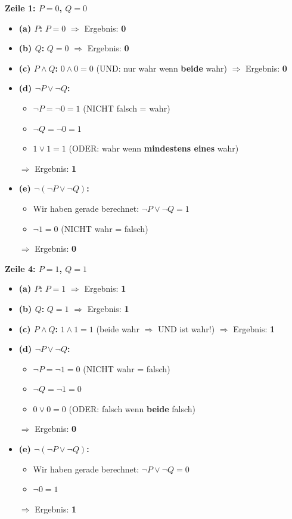\documentclass[a4paper,12pt]{article}
\begin{document}
\textbf{Zeile 1: $P=0$, $Q=0$}

\begin{itemize}
\item \textbf{(a) $P$:} $P = 0$ $\Rightarrow$ Ergebnis: \textbf{0}
\item \textbf{(b) $Q$:} $Q = 0$ $\Rightarrow$ Ergebnis: \textbf{0}
\item \textbf{(c) $P \wedge Q$:} $0 \wedge 0 = 0$ (UND: nur wahr wenn \textbf{beide} wahr) $\Rightarrow$ Ergebnis: \textbf{0}
\item \textbf{(d) $\neg P \vee \neg Q$:}
  \begin{itemize}
  \item $\neg P = \neg 0 = 1$ \quad (NICHT falsch = wahr)
  \item $\neg Q = \neg 0 = 1$
  \item $1 \vee 1 = 1$ \quad (ODER: wahr wenn \textbf{mindestens eines} wahr)
  \end{itemize}
  $\Rightarrow$ Ergebnis: \textbf{1}
\item \textbf{(e) $\neg(\neg P \vee \neg Q)$:}
  \begin{itemize}
  \item Wir haben gerade berechnet: $\neg P \vee \neg Q = 1$
  \item $\neg 1 = 0$ \quad (NICHT wahr = falsch)
  \end{itemize}
  $\Rightarrow$ Ergebnis: \textbf{0}
\end{itemize}

\bigskip

\textbf{Zeile 4: $P=1$, $Q=1$}

\begin{itemize}
\item \textbf{(a) $P$:} $P = 1$ $\Rightarrow$ Ergebnis: \textbf{1}
\item \textbf{(b) $Q$:} $Q = 1$ $\Rightarrow$ Ergebnis: \textbf{1}
\item \textbf{(c) $P \wedge Q$:} $1 \wedge 1 = 1$ (beide wahr $\Rightarrow$ UND ist wahr!) $\Rightarrow$ Ergebnis: \textbf{1}
\item \textbf{(d) $\neg P \vee \neg Q$:}
  \begin{itemize}
  \item $\neg P = \neg 1 = 0$ \quad (NICHT wahr = falsch)
  \item $\neg Q = \neg 1 = 0$
  \item $0 \vee 0 = 0$ \quad (ODER: falsch wenn \textbf{beide} falsch)
  \end{itemize}
  $\Rightarrow$ Ergebnis: \textbf{0}
\item \textbf{(e) $\neg(\neg P \vee \neg Q)$:}
  \begin{itemize}
  \item Wir haben gerade berechnet: $\neg P \vee \neg Q = 0$
  \item $\neg 0 = 1$
  \end{itemize}
  $\Rightarrow$ Ergebnis: \textbf{1}
\end{itemize}
\end{document}
